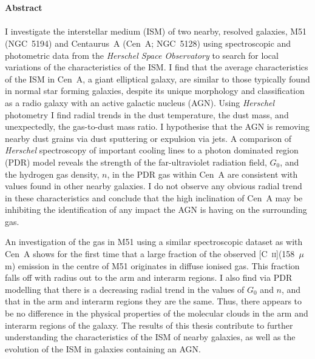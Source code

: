 \thispagestyle{fancy}

\textrm{}\\\\
\noindent\textbf{\huge\textsf{Abstract}}\\\\

\noindent I investigate the interstellar medium (ISM) of two nearby, resolved galaxies, M51 (NGC~5194) and Centaurus~A (Cen~A; NGC~5128) using spectroscopic and photometric data from the \emph{Herschel Space Observatory} to search for local variations of the characteristics of the ISM.  I find that the average characteristics of the ISM in Cen~A, a giant elliptical galaxy, are similar to those typically found in normal star forming galaxies, despite its unique morphology and classification as a radio galaxy with an active galactic nucleus (AGN).  Using \emph{Herschel} photometry I find radial trends in the dust temperature, the dust mass, and unexpectedly, the gas-to-dust mass ratio.  I hypothesise that the AGN is removing nearby dust grains via dust sputtering or expulsion via jets.  A comparison of \emph{Herschel} spectroscopy of important cooling lines to a photon dominated region (PDR) model reveals the strength of the far-ultraviolet radiation field, $G_{0}$, and the hydrogen gas density, $n$, in the PDR gas within Cen~A are consistent with values found in other nearby galaxies.  I do not observe any obvious radial trend in these characteristics and conclude that the high inclination of Cen~A may be inhibiting the identification of any impact the AGN is having on the surrounding gas.

An investigation of the gas in M51 using a similar spectroscopic dataset as with Cen~A shows for the first time that a large fraction of the observed [C~\textsc{ii}](158~$\mu$m) emission in the centre of M51 originates in diffuse ionised gas.  This fraction falls off with radius out to the arm and interarm regions.  I also find via PDR modelling that there is a decreasing radial trend in the values of $G_{0}$ and $n$, and that in the arm and interarm regions they are the same.  Thus, there appears to be no difference in the physical properties of the molecular clouds in the arm and interarm regions of the galaxy.  The results of this thesis contribute to further understanding the characteristics of the ISM of nearby galaxies, as well as the evolution of the ISM in galaxies containing an AGN.


\newpage
\thispagestyle{empty}
\mbox{}
